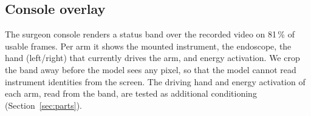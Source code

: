 \subsection{Console overlay}
The surgeon console renders a status band over the recorded video on 81\,\% of usable frames. Per arm it shows the mounted instrument, the endoscope, the hand (left/right) that currently drives the arm, and energy activation. We crop the band away before the model sees any pixel, so that the model cannot read instrument identities from the screen. The driving hand and energy activation of each arm, read from the band, are tested as additional conditioning (Section~\ref{sec:parts}).

